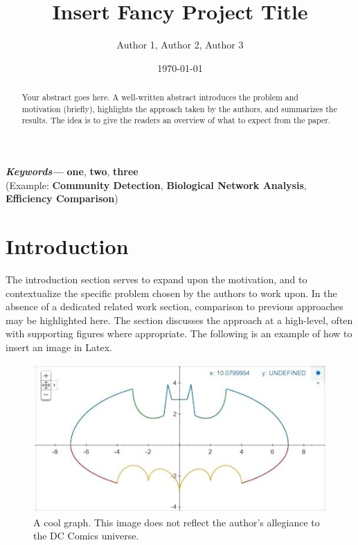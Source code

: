 \documentclass[a4paper]{article}
\providecommand{\keywords}[1]
{
  \small	
  \textbf{\; \textit{Keywords---}} #1
}
\begin{document}
\title{\textbf{\huge{Insert Fancy Project Title}}}

\author{\textbf\large{Author 1, Author 2, Author 3}}



\date{\today}

\maketitle
\begin{abstract}
Your abstract goes here. A well-written abstract introduces the problem and motivation (briefly), highlights the approach taken by the authors, and summarizes the results. The idea is to give the readers an overview of what to expect from the paper.
\end{abstract}\maketitle

\keywords{\textbf{one}, \textbf{two}, \textbf{three} \\(Example: \textbf{Community Detection}, \textbf{Biological Network Analysis}, \textbf{Efficiency Comparison})}

\section*{Introduction}

The introduction section serves to expand upon the motivation, and to contextualize the specific problem chosen by the authors to work upon. In the absence of a dedicated related work section, comparison to previous approaches may be highlighted here. The section discusses the approach at a high-level, often with supporting figures where appropriate. The following is an example of how to insert an image in Latex.

\begin{figure}[h]
    \centering
    \includegraphics[width=0.8\linewidth]{batman.jpg}
    \caption{A cool graph. This image does not reflect the author's allegiance to the DC Comics universe.}
    \label{fig:1}
\end{figure}
\end{document}
